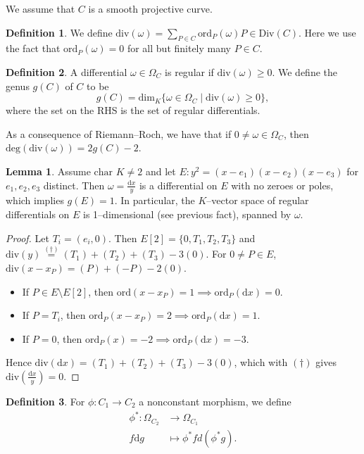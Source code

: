 \documentclass{article}
\theoremstyle{definition}
\newtheorem{lemma}[theorem]{Lemma}
\newtheorem{defn}{Definition}[section]
\begin{document}
We assume that $C$ is a smooth projective curve.
\begin{defn}
    We define $\text{div}(\omega) = \sum_{P \in C}^{} \text{ord}_P(\omega)P \in \text{Div}(C)$. Here we use the fact that $\text{ord}_P(\omega) = 0$ for all but finitely many $P \in C$.
\end{defn}
\begin{defn}
    A differential $\omega \in \Omega_C$ is regular if $\text{div}(\omega)\ge 0$. We define the genus $g(C)$ of $C$ to be \[
    g(C) = \text{dim}_K \{\omega \in \Omega_C \mid \text{div}(\omega)\ge 0\},
    \]
    where the set on the RHS is the set of regular differentials.
\end{defn}
As a consequence of Riemann--Roch, we have that if $0 \neq \omega \in \Omega_C$, then $\text{deg}(\text{div}(\omega)) = 2g(C)-2$.
\begin{lemma}
    Assume $\text{char }K \neq 2$ and let $E : y^2 = (x-e_1)(x-e_2)(x-e_3)$ for $e_1,e_2,e_3$ distinct. Then $\omega = \frac{\mathrm{d}x}{y}$ is a differential on $E$ with no zeroes or poles, which implies $g(E)=1$. In particular, the $K$--vector space of regular differentials on $E$ is 1--dimensional (see previous fact), spanned by $\omega$.
\end{lemma}
\begin{proof}
    Let $T_i = (e_i,0)$. Then $E[2]=\{0,T_1,T_2,T_3\}$ and $\text{div}(y) \stackrel{(\dagger)}{=} (T_1)+(T_2)+(T_3)-3(0)$. For $0 \neq P \in E$, $\text{div}(x-x_P) = (P)+(-P)-2(0)$. 
    \begin{itemize}
        \item If $P \in E\setminus E[2]$, then $\text{ord}(x-x_P)=1 \implies \text{ord}_P(\mathrm{d}x) = 0$.
        \item If $P = T_i$, then $\text{ord}_P(x-x_P) = 2 \implies \text{ord}_P(\mathrm{d}x)=1$. 
        \item If $P=0$, then $\text{ord}_P(x)= - 2 \implies \text{ord}_P(\mathrm{d}x) = -3$.
    \end{itemize}
    Hence $\text{div}(\mathrm{d}x) = (T_1)+(T_2)+(T_3) - 3(0)$, which with $(\dagger)$ gives $\text{div}\left(\frac{\mathrm{d}x}{y}\right) = 0$.
\end{proof}
\begin{defn}
    For $\phi : C_1 \to C_2$ a nonconstant morphism, we define 
    \begin{align*}
        \phi^* : \Omega_{C_2} &\to \Omega_{C_1}\\
        f \mathrm{d}g &\mapsto \phi^* f d(\phi^* g).
    \end{align*}
\end{defn}
\end{document}
